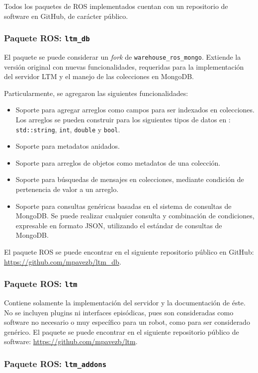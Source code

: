 Todos los paquetes de ROS implementados cuentan con un repositorio de software en GitHub, de carácter público.

\subsubsection{Paquete ROS: \texttt{ltm\_db}}

El paquete se puede considerar un \textit{fork} de \texttt{warehouse\_ros\_mongo}. Extiende la versión original con nuevas funcionalidades, requeridas para la implementación del servidor LTM y el manejo de las colecciones en MongoDB.

Particularmente, se agregaron las siguientes funcionalidades:
\begin{itemize}
\item Soporte para agregar arreglos como campos para ser indexados en colecciones. Los arreglos se pueden construir para los siguientes tipos de datos en \CC: \texttt{std::string}, \texttt{int}, \texttt{double} y \texttt{bool}. 
\item Soporte para metadatos anidados.
\item Soporte para arreglos de objetos como metadatos de una colección.
\item Soporte para búsquedas de mensajes en colecciones, mediante condición de pertenencia de valor a un arreglo.
\item Soporte para consultas genéricas basadas en el sistema de consultas de MongoDB. Se puede realizar cualquier consulta y combinación de condiciones, expresable en formato JSON, utilizando el estándar de consultas de MongoDB.
\end{itemize}

El paquete ROS se puede encontrar en el siguiente repositorio público en GitHub: \url{https://github.com/mpavezb/ltm\_db}.

\subsubsection{Paquete ROS: \texttt{ltm}}

Contiene solamente la implementación del servidor y la documentación de éste. No se incluyen plugins ni interfaces episódicas, pues son consideradas como software no necesario o muy específico para un robot, como para ser considerado genérico. El paquete se puede encontrar en el siguiente repositorio público de software: \url{https://github.com/mpavezb/ltm}.

\subsubsection{Paquete ROS: \texttt{ltm\_addons}}

